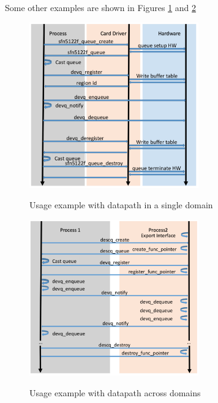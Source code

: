 \documentclass[a4paper,11pt,twoside]{report}
\begin{document}
Some other examples are shown in Figures \ref{fig:oneproc} and \ref{fig:twoproc}
\begin{figure}[!h]
	\begin{center}
		\caption{Usage example with datapath in a single domain}
		\includegraphics[width=0.65\textwidth]{pics/oneproc.pdf}
		\label{fig:oneproc}
	\end{center}
\end{figure}

\begin{figure}[!h]
	\begin{center}
		\caption{Usage example with datapath across domains}
		\includegraphics[width=0.65\textwidth]{pics/twoproc.pdf}
		\label{fig:twoproc}
	\end{center}
\end{figure}



	
	
\end{document}
